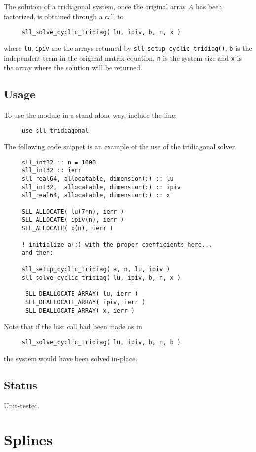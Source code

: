 \documentclass[]{report}   %
\begin{document}
The solution of a tridiagonal system, once the original array $A$ has been factorized, is obtained through a call to 
\begin{verbatim}
     sll_solve_cyclic_tridiag( lu, ipiv, b, n, x )
\end{verbatim}
where \verb+lu+, \verb+ipiv+ are the arrays returned by \verb+sll_setup_cyclic_tridiag()+, \verb+b+ is the independent term in the original matrix equation, \verb+n+ is the system size and \verb+x+ is the array where the solution will be returned.
  
\subsection{Usage}
To use the module in a stand-alone way, include the line:
\begin{verbatim}
     use sll_tridiagonal
\end{verbatim}
The following code snippet is an example of the use of the tridiagonal solver.
\begin{verbatim}
     sll_int32 :: n = 1000
     sll_int32 :: ierr
     sll_real64, allocatable, dimension(:) :: lu
     sll_int32,  allocatable, dimension(:) :: ipiv
     sll_real64, allocatable, dimension(:) :: x

     SLL_ALLOCATE( lu(7*n), ierr )
     SLL_ALLOCATE( ipiv(n), ierr )
     SLL_ALLOCATE( x(n), ierr )
     
     ! initialize a(:) with the proper coefficients here... 
     and then:
     
     sll_setup_cyclic_tridiag( a, n, lu, ipiv )
     sll_solve_cyclic_tridiag( lu, ipiv, b, n, x )
     
      SLL_DEALLOCATE_ARRAY( lu, ierr )
      SLL_DEALLOCATE_ARRAY( ipiv, ierr )
      SLL_DEALLOCATE_ARRAY( x, ierr )
\end{verbatim}
Note that if the last call had been made as in
\begin{verbatim}
     sll_solve_cyclic_tridiag( lu, ipiv, b, n, b )
\end{verbatim}
the system would have been solved in-place.

\subsection{Status}
Unit-tested.

\section{Splines}
\end{document}
